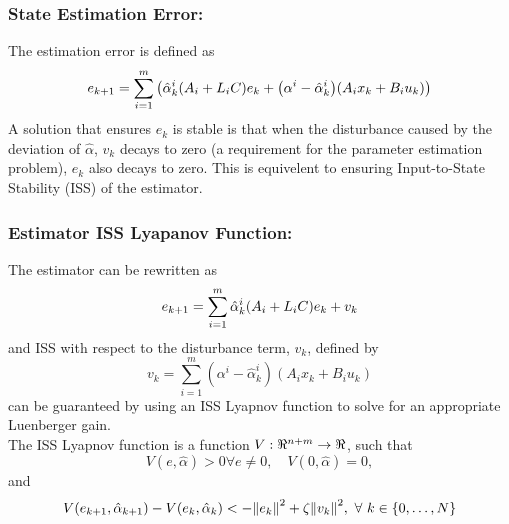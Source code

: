 \documentclass[]{article}
\begin{document}
\subsubsection{State Estimation Error:}
The estimation error is defined as
\begin{equation} \label{eq:DE_state_error}
	e_{k+1} = \sum_{i=1}^m \qty(\hat{\alpha}_k^i\qty(A_i + L_i C)e_k + \qty(\alpha^i - \hat{\alpha}_k^i)\qty(A_i x_k + B_i u_k))
\end{equation}
A solution that ensures $e_k$ is stable is that when the disturbance caused by the deviation of $\hat{\alpha}$, $v_k$ decays to zero (a requirement for the parameter estimation problem), $e_k$ also decays to zero. This is equivelent to ensuring Input-to-State Stability (ISS) of the estimator.\\

\subsubsection{Estimator ISS Lyapanov Function:}
The estimator can be rewritten as
\begin{equation}\label{eq:DE_state_error_simple}
	e_{k+1} = \sum_{i=1}^m \hat{\alpha}_k^i \qty(A_i + L_i C) e_k + v_k
\end{equation}
and ISS with respect to the disturbance term, $v_k$, defined by
\begin{equation}
	v_k = \sum_{i=1}^m (\alpha^i - \hat{\alpha}_k^i) (A_i x_k + B_i u_k)
\end{equation}
can be guaranteed by using an ISS Lyapnov function to solve for an appropriate Luenberger gain.\\
The ISS Lyapnov function is a function $V : \real^{n+m} \to \real$, such that $$V(e,\hat{\alpha})>0 \forall e\neq 0, \quad V(0,\hat{\alpha}) = 0,$$ and
\begin{equation}
	V(e_{k+1}, \hat{\alpha}_{k+1}) - V(e_k, \hat{\alpha}_k) < -\norm{e_k}^2 + \zeta \norm{v_k}^2, \ \forall \ k \in \{0, \dots,N\}
\end{equation}


\newpage
\end{document}
